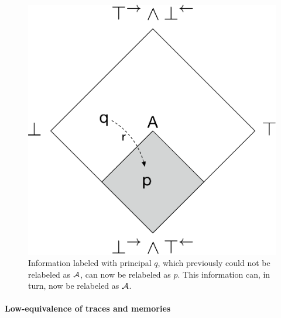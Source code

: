 \begin{figure}
    \centering
    \includegraphics[scale=0.25]{Illustrations/bad-flow.pdf}
    \caption{Information labeled with principal $q$, which previously could not be relabeled as $\mathcal{A}$, can now be relabeled as $p$. This information can, in turn, now be relabeled as $\mathcal{A}$.}
    \label{fig:bad-release}
\end{figure}

\paragraph{Low-equivalence of traces and memories}

